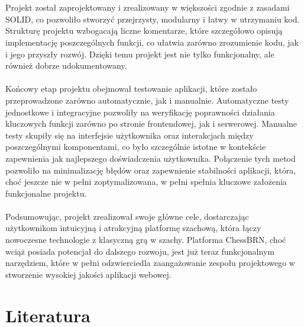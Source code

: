 \documentclass[12pt,a4paper]{article}
\begin{document}
\\\\
Projekt został zaprojektowany i zrealizowany w większości zgodnie z zasadami SOLID, co pozwoliło stworzyć przejrzysty, modularny i łatwy w utrzymaniu kod. Strukturę projektu wzbogacają liczne komentarze, które szczegółowo opisują implementację poszczególnych funkcji, co ułatwia zarówno zrozumienie kodu, jak i jego przyszły rozwój. Dzięki temu projekt jest nie tylko funkcjonalny, ale również dobrze udokumentowany.
\\\\
Końcowy etap projektu obejmował testowanie aplikacji, które zostało przeprowadzone zarówno automatycznie, jak i manualnie. Automatyczne testy jednostkowe i integracyjne pozwoliły na weryfikację poprawności działania kluczowych funkcji zarówno po stronie frontendowej, jak i serwerowej. Manualne testy skupiły się na interfejsie użytkownika oraz interakcjach między poszczególnymi komponentami, co było szczególnie istotne w kontekście zapewnienia jak najlepszego doświadczenia użytkownika. Połączenie tych metod pozwoliło na minimalizację błędów oraz zapewnienie stabilności aplikacji, która, choć jeszcze nie w pełni zoptymalizowana, w pełni spełnia kluczowe założenia funkcjonalne projektu.
\\\\
Podsumowując, projekt zrealizował swoje główne cele, dostarczając użytkownikom intuicyjną i atrakcyjną platformę szachową, która łączy nowoczesne technologie z klasyczną grą w szachy. Platforma ChessBRN, choć wciąż posiada potencjał do dalszego rozwoju, jest już teraz funkcjonalnym narzędziem, które w pełni odzwierciedla zaangażowanie zespołu projektowego w stworzenie wysokiej jakości aplikacji webowej.

\newpage

\section{Literatura}
\end{document}
